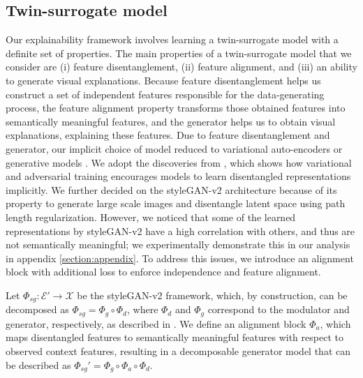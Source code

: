 \documentclass{article}
\newcommand{\ftcom}[2][]{\todo[author=FT, #1]{#2}}
\begin{document}
\subsection{Twin-surrogate model}
\label{subsec:surrogate}
Our explainability framework involves learning a twin-surrogate model with a definite set of properties. 
The main properties of a twin-surrogate model that we consider are (i) feature disentanglement, (ii) feature alignment, and (iii) an ability to generate visual explanations.
Because feature disentanglement helps us construct a set of independent features responsible for the data-generating process, the feature alignment property transforms those obtained features into semantically meaningful features, and the generator helps us to obtain visual explanations, explaining these features.
Due to feature disentanglement and generator, our implicit choice of model reduced to variational auto-encoders \cite{kingma2019introduction} or generative models \cite{goodfellow2014generative}. 
We adopt the discoveries from \cite{locatello2019challenging}, which shows how variational and adversarial training encourages models to learn disentangled representations implicitly.
We further decided on the styleGAN-v2 \cite{karras2020analyzing} architecture because of its property to generate large scale images and disentangle latent space using path length regularization.
However, we noticed that some of the learned representations by styleGAN-v2 have a high correlation with others, and thus are not semantically meaningful; we experimentally demonstrate this in our analysis in appendix \ref{section:appendix}. 
To address this issues, we introduce an alignment block with additional loss to enforce independence and feature alignment. 

Let $\Phi_{sg}: \mathcal{E}' \rightarrow \mathcal{X}$ be %
the styleGAN-v2 framework, which, by construction, can be decomposed as $\Phi_{sg} = \Phi_{g} \circ \Phi_d$, where $\Phi_d$ and $\Phi_{g}$ correspond to the modulator and generator, respectively, as described in \cite{karras2020analyzing}. 
We define an alignment block $\Phi_{a}$, which maps disentangled features to semantically meaningful features with respect to observed context features, resulting in a decomposable generator model that can be described as $\Phi_{sg}' = \Phi_g \circ \Phi_a \circ \Phi_d$. 
\end{document}
